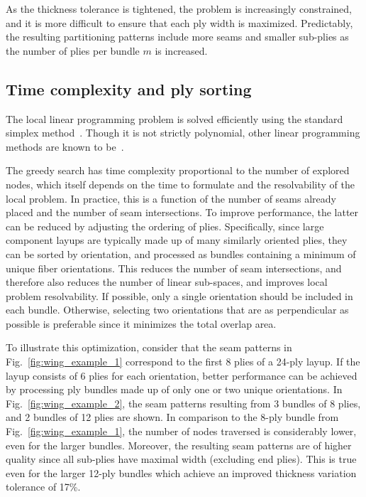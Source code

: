 As the thickness tolerance is tightened, the problem is increasingly constrained, and it is more difficult to ensure that each ply width is maximized. Predictably, the resulting partitioning patterns include more seams and smaller sub-plies as the number of plies per bundle $m$ is increased. 

\subsection{Time complexity and ply sorting}
The local linear programming problem is solved efficiently using the standard simplex method~\cite{ficken2015simplex}. Though it is not strictly polynomial, other linear programming methods are known to be~\cite{megiddo1986complexity}.

The greedy search has time complexity proportional to the number of explored nodes, which itself depends on the time to formulate and the resolvability of the local problem. In practice, this is a function of the number of seams already placed and the number of seam intersections.
To improve performance, the latter can be reduced by adjusting the ordering of plies. Specifically, since large component layups are typically made up of many similarly oriented plies, they can be sorted by orientation, and processed as bundles containing a minimum of unique fiber orientations. This reduces the number of seam intersections, and therefore also reduces the number of linear sub-spaces, and improves local problem resolvability. If possible, only a single orientation should be included in each bundle. Otherwise, selecting two orientations that are as perpendicular as possible is preferable since it minimizes the total overlap area.

To illustrate this optimization, consider that the seam patterns in Fig.~\ref{fig:wing_example_1} correspond to the first 8 plies of a 24-ply layup. If the layup consists of 6 plies for each orientation, better performance can be achieved by processing ply bundles made up of only one or two unique orientations. In Fig.~\ref{fig:wing_example_2}, the seam patterns resulting from 3 bundles of 8 plies, and 2 bundles of 12 plies are shown. In comparison to the 8-ply bundle from Fig.~\ref{fig:wing_example_1}, the number of nodes traversed is considerably lower, even for the larger bundles. Moreover, the resulting seam patterns are of higher quality since all sub-plies have maximal width (excluding end plies). This is true even for the larger 12-ply bundles which achieve an improved thickness variation tolerance of 17\%. 

